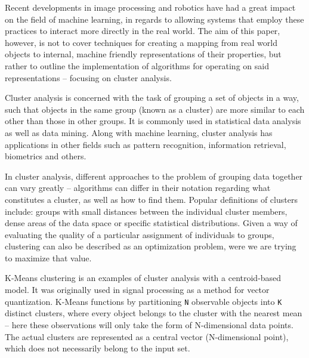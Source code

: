 \documentclass{l4proj}
\begin{document}
Recent developments in image processing and robotics have had a great impact on the field of machine learning, in regards to allowing systems that employ these practices to interact more directly in the real world. The aim of this paper, however, is not to cover techniques for creating a mapping from real world objects to internal, machine friendly representations of their properties, but rather to outline the implementation of algorithms for operating on said representations -- focusing on cluster analysis.

Cluster analysis is concerned with the task of grouping a set of objects in a way, such that objects in the same group (known as a cluster) are more similar to each other than those in other groups\cite{MLIntro}. It is commonly used in statistical data analysis as well as data mining. Along with machine learning, cluster analysis has applications in other fields such as pattern recognition, information retrieval, biometrics and others.

In cluster analysis, different approaches to the problem of grouping data together can vary greatly -- algorithms can differ in their notation regarding what constitutes a cluster, as well as how to find them. Popular definitions of clusters include: groups with small distances between the individual cluster members, dense areas of the data space or specific statistical distributions. Given a way of evaluating the quality of a particular assignment of individuals to groups, clustering can also be described as an optimization problem, were we are trying to maximize that value.

K-Means clustering is an examples of cluster analysis with a centroid-based model\cite{TopTen}. It was originally used in signal processing as a method for vector quantization. K-Means functions by partitioning \texttt{N} observable objects into \texttt{K} distinct clusters, where every object belongs to the cluster with the nearest mean  -- here these observations will only take the form of N-dimensional data points. The actual clusters are represented as a central vector (N-dimensional point), which does not necessarily belong to the input set.
\end{document}
